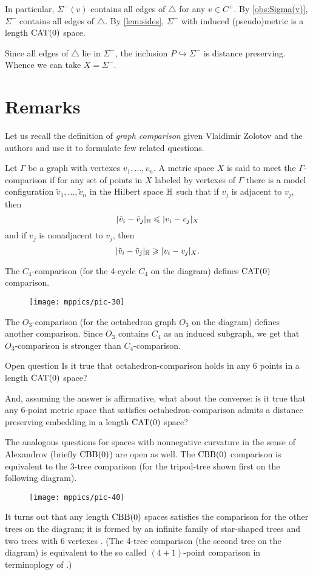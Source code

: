\documentclass{article}
\begin{document}
In particular, $\Sigma^-(v)$ contains all edges of $\triangle$ for any $v\in C^+$.
By \ref{obs:Sigma(v)}, $\Sigma^-$ contains all edges of $\triangle$.
By \ref{lem:sides}, $\Sigma^-$ with induced (pseudo)metric is a length $\mathrm{CAT}(0)$ space.

Since all edges of $\triangle$ lie in $\Sigma^-$, the inclusion $P\hookrightarrow \Sigma^-$ is distance preserving.
Whence we can take $X=\Sigma^-$.
\qeds

\section{Remarks}

Let us recall the definition of \emph{graph comparison} given Vlaidimir Zolotov and the authors \cite{lebedeva-petrunin-zolotov} and use it to formulate few related questions.

Let $\Gamma$ be a graph with vertexes $v_1,\dots,v_n$.
A metric space $X$ is said to meet the $\Gamma$-comparison if for any set of points in $X$ labeled by vertexes of $\Gamma$ there is a model configuration $\tilde v_1,\dots,\tilde v_n$ in the Hilbert space $\mathbb H$ such that 
if $v_j$ is adjacent to $v_j$, then
\[|\tilde v_i-\tilde v_j|_{\mathbb H}\leqslant | v_i-v_j|_{X}\]
and
if $v_j$ is nonadjacent to $v_j$, then
\[|\tilde v_i-\tilde v_j|_{\mathbb H}\geqslant | v_i-v_j|_{X}.\]

The $C_4$-comparison (for the 4-cycle $C_4$ on the diagram) defines $\mathrm{CAT}(0)$ comparison.
\begin{figure}[h!]
\vskip-0mm
\centering
\texttt{[image: mppics/pic-30]}
\end{figure}
The $O_3$-comparison (for the octahedron graph $O_3$ on the diagram) defines another comparison.
Since $O_3$ contains $C_4$ as an induced subgraph, we get that $O_3$-comparison is stronger than $C_4$-comparison.

\begin{thm}{Open question}
Is it true that octahedron-comparison holds in any 6 points in a length $\mathrm{CAT}(0)$ space?

And, assuming the answer is affirmative, what about the converse: is it true that any 6-point metric space that satisfies octahedron-comparison admits a distance preserving embedding in a length $\mathrm{CAT}(0)$ space?
\end{thm}


The analogous questions for  spaces with nonnegative curvature in the sense of Alexandrov (briefly $\mathrm{CBB}(0)$) are open as well.
The $\mathrm{CBB}(0)$ comparison is equivalent to the $3$-tree comparison (for the tripod-tree shown first on the following diagram).
\begin{figure}[h!]
\vskip-0mm
\centering
\texttt{[image: mppics/pic-40]}
\end{figure}
It turns out that any length $\mathrm{CBB}(0)$ spaces satisfies the comparison for the other trees on the diagram; it is formed by an infinite family of star-shaped trees and two trees with 6 vertexes \cite{alexander-kapovitch-petrunin-2011,lebedeva-petrunin-zolotov}.
(The 4-tree comparison (the second tree on the diagram) is equivalent to the so called $(4{+}1)$-point comparison in terminoplogy of \cite{alexander-kapovitch-petrunin-2011}.)
\end{document}
